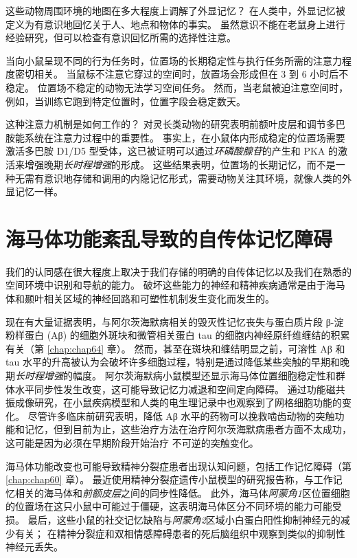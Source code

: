 这些动物周围环境的地图在多大程度上调解了外显记忆？ 在人类中，外显记忆被定义为有意识地回忆关于人、地点和物体的事实。
虽然意识不能在老鼠身上进行经验研究，但可以检查有意识回忆所需的选择性注意。


当向小鼠呈现不同的行为任务时，位置场的长期稳定性与执行任务所需的注意力程度密切相关。
当鼠标不注意它穿过的空间时，放置场会形成但在 3 到 6 小时后不稳定。
位置场不稳定的动物无法学习空间任务。
然而，当老鼠被迫注意空间时，例如，当训练它跑到特定位置时，位置字段会稳定数天。


这种注意力机制是如何工作的？
对灵长类动物的研究表明前额叶皮层和调节多巴胺能系统在注意力过程中的重要性。
事实上，在小鼠体内形成稳定的位置场需要激活多巴胺 D1/D5 型受体，这已被证明可以通过\textit{环磷酸腺苷}的产生和 PKA 的激活来增强晚期\textit{长时程增强}的形成。
这些结果表明，位置场的长期记忆，而不是一种无需有意识地存储和调用的内隐记忆形式，需要动物关注其环境，就像人类的外显记忆一样。



\section{海马体功能紊乱导致的自传体记忆障碍}

我们的认同感在很大程度上取决于我们存储的明确的自传体记忆以及我们在熟悉的空间环境中识别和导航的能力。
破坏这些能力的神经和精神疾病通常是由于海马体和颞叶相关区域的神经回路和可塑性机制发生变化而发生的。


现在有大量证据表明，与阿尔茨海默病相关的毁灭性记忆丧失与蛋白质片段 β-淀粉样蛋白 (Aβ) 的细胞外斑块和微管相关蛋白 tau 的细胞内神经原纤维缠结的积累有关（第 \ref{chap:chap64} 章）。
然而，甚至在斑块和缠结明显之前，可溶性 Aβ 和 tau 水平的升高被认为会破坏许多细胞过程，特别是通过降低某些突触的早期和晚期\textit{长时程增强}的幅度。
阿尔茨海默病小鼠模型还显示海马体位置细胞稳定性和群体水平同步性发生改变，这可能导致记忆力减退和空间定向障碍。
通过功能磁共振成像研究，在小鼠疾病模型和人类的电生理记录中也观察到了网格细胞功能的变化。
尽管许多临床前研究表明，降低 Aβ 水平的药物可以挽救啮齿动物的突触功能和记忆，但到目前为止，这些治疗方法在治疗阿尔茨海默病患者方面不太成功，这可能是因为必须在早期阶段开始治疗 不可逆的突触变化。


海马体功能改变也可能导致精神分裂症患者出现认知问题，包括工作记忆障碍（第 \ref{chap:chap60} 章）。
最近使用精神分裂症遗传小鼠模型的研究报告称，与工作记忆相关的海马体和\textit{前额皮层}之间的同步性降低。
此外，海马体\textit{阿蒙角1}区位置细胞的位置场在这只小鼠中可能过于僵硬，这表明海马体区分不同环境的能力可能受损。
最后，这些小鼠的社交记忆缺陷与\textit{阿蒙角2}区域小白蛋白阳性抑制神经元的减少有关；
在精神分裂症和双相情感障碍患者的死后脑组织中观察到类似的抑制性神经元丢失。


